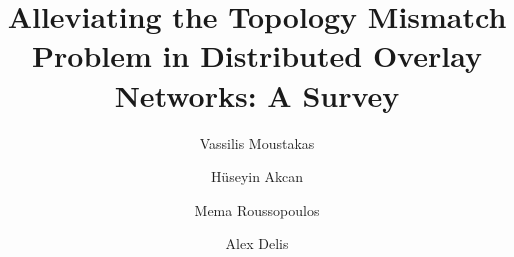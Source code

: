 \documentclass[final,5p,times,twocolumn,authoryear]{elsarticle}
\begin{document}
\begin{frontmatter}



\title{Alleviating the Topology Mismatch Problem in Distributed Overlay Networks: A Survey}


% 


\author[rvt0]{Vassilis Moustakas} %
\author[focal]{H\"useyin Akcan} %
\author[rvt]{Mema Roussopoulos} %
\author[rvt]{Alex Delis} %
\address[rvt0]{Amazon Development Center Germany GmbH, Marcel-Breuer Str. 12, 80807 Munich, Germany}
\address[focal]{Department of Software Engineering, Izmir University of Economics, 35330 Balcova, Izmir, Turkey}
\address[rvt]{Department of Informatics and Telecommunications, University of Athens, Athens, 15703, Greece}




\end{frontmatter}
\end{document}
